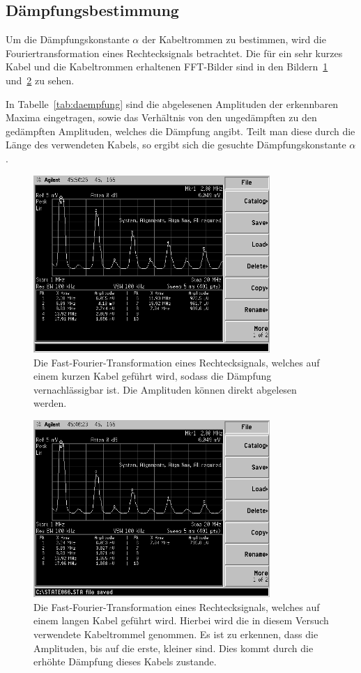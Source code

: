 \subsection{Dämpfungsbestimmung}
%
Um die Dämpfungskonstante $\alpha$ der Kabeltrommen zu bestimmen, wird
die Fouriertransformation eines Rechtecksignals betrachtet. Die für ein
sehr kurzes Kabel und die Kabeltrommen erhaltenen FFT-Bilder sind in den
Bildern~\ref{fig:daempfung_kurz} und~\ref{fig:daempfung_lang} zu sehen.

In Tabelle~\ref{tab:daempfung} sind die abgelesenen Amplituden der
erkennbaren Maxima eingetragen, sowie das Verhältnis von den
ungedämpften zu den gedämpften Amplituden, welches die Dämpfung
angibt. Teilt man diese durch die Länge des verwendeten Kabels, so
ergibt sich die gesuchte Dämpfungskonstante $\alpha$.
%
\begin{figure}[]
  \centering
  \includegraphics[width=0.8\textwidth]{daempfung_kurz.png}
  \caption{Die Fast-Fourier-Transformation eines Rechtecksignals,
    welches auf einem kurzen Kabel geführt wird, sodass die Dämpfung
    vernachlässigbar ist. Die Amplituden können direkt abgelesen
    werden.}
  \label{fig:daempfung_kurz}
\end{figure}
%
\begin{figure}[]
  \centering
  \includegraphics[width=0.8\textwidth]{daempfung_lang.png}
  \caption{Die Fast-Fourier-Transformation eines Rechtecksignals,
    welches auf einem langen Kabel geführt wird. Hierbei wird die in
    diesem Versuch verwendete Kabeltrommel genommen.  Es ist zu
    erkennen, dass die Amplituden, bis auf die erste, kleiner sind. Dies
    kommt durch die erhöhte Dämpfung dieses Kabels zustande.}
  \label{fig:daempfung_lang}
\end{figure}
